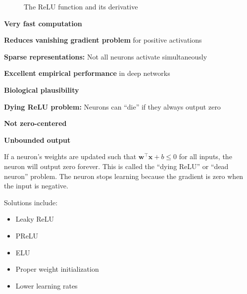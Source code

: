 \begin{figure}[h]
    \centering
    \caption[ReLU function and its derivative]{The ReLU function and its derivative}
    \label{fig:relu}
\end{figure}

\begin{advantages}
    \item \textbf{Very fast computation}
    \item \textbf{Reduces vanishing gradient problem} for positive activations
    \item \textbf{Sparse representations:} Not all neurons activate simultaneously
    \item \textbf{Excellent empirical performance} in deep networks
    \item \textbf{Biological plausibility}
\end{advantages}

\begin{disadvantages}
    \item \textbf{Dying ReLU problem:} Neurons can ``die'' if they always output zero
    \item \textbf{Not zero-centered}
    \item \textbf{Unbounded output}
\end{disadvantages}

\begin{note}
If a neuron's weights are updated such that $\mathbf{w}^\top \mathbf{x} + b \leq 0$ for all inputs, the neuron will output zero forever. This is called the ``dying ReLU'' or ``dead neuron'' problem. The neuron stops learning because the gradient is zero when the input is negative.

Solutions include:
\begin{itemize}
    \item Leaky ReLU
    \item PReLU
    \item ELU
    \item Proper weight initialization
    \item Lower learning rates
\end{itemize}
\end{note}


